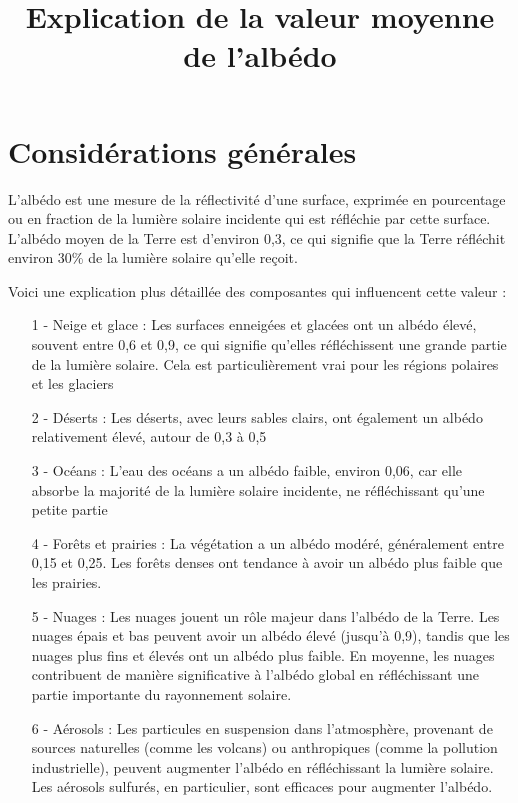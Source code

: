 \documentclass[a4paper,11pt]{article}
\title{Explication de la valeur moyenne de l'albédo}
\begin{document}
\maketitle

\section{Considérations générales}

L'albédo est une mesure de la réflectivité d'une surface, exprimée en pourcentage ou en fraction de la lumière solaire incidente qui est réfléchie par cette surface. L'albédo moyen de la Terre est d'environ 0,3, ce qui signifie que la Terre réfléchit environ 30\% de la lumière solaire qu'elle reçoit.

Voici une explication plus détaillée des composantes qui influencent cette valeur :

\begin{enumerate}

\item[1 -] Neige et glace : Les surfaces enneigées et glacées ont un albédo élevé, souvent entre 0,6 et 0,9, ce qui signifie qu'elles réfléchissent une grande partie de la lumière solaire. Cela est particulièrement vrai pour les régions polaires et les glaciers

\item[2 -] Déserts : Les déserts, avec leurs sables clairs, ont également un albédo relativement élevé, autour de 0,3 à 0,5

\item[3 -] Océans : L'eau des océans a un albédo faible, environ 0,06, car elle absorbe la majorité de la lumière solaire incidente, ne réfléchissant qu'une petite partie

\item[4 -] Forêts et prairies : La végétation a un albédo modéré, généralement entre 0,15 et 0,25. Les forêts denses ont tendance à avoir un albédo plus faible que les prairies.

\item[5 -] Nuages : Les nuages jouent un rôle majeur dans l'albédo de la Terre. Les nuages épais et bas peuvent avoir un albédo élevé (jusqu'à 0,9), tandis que les nuages plus fins et élevés ont un albédo plus faible. En moyenne, les nuages contribuent de manière significative à l'albédo global en réfléchissant une partie importante du rayonnement solaire.

\item[6 -] Aérosols : Les particules en suspension dans l'atmosphère, provenant de sources naturelles (comme les volcans) ou anthropiques (comme la pollution industrielle), peuvent augmenter l'albédo en réfléchissant la lumière solaire. Les aérosols sulfurés, en particulier, sont efficaces pour augmenter l'albédo.

\end{enumerate}	
\end{document}
